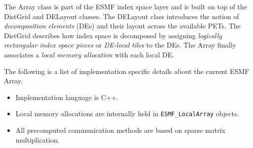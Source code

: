 

The Array class is part of the ESMF index space layer and is built on top of the DistGrid and DELayout classes. The DELayout class introduces the notion of 
{\em decomposition elements} (DEs) and their layout across the available PETs. The DistGrid describes how index space is decomposed by assigning {\em logically rectangular index space pieces} or {\em DE-local tiles} to the DEs. The Array finally associates a {\em local memory allocation} with each local DE.

The following is a list of implementation specific details about the current ESMF Array.

\begin{itemize}
\item Implementation language is C++.
\item Local memory allocations are internally held in {\tt ESMF\_LocalArray}
objects.
\item All precomputed communication methods are based on sparse matrix
multiplication.
\end{itemize}
